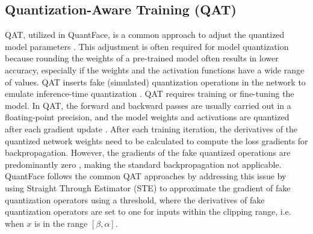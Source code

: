 \documentclass[a4paper,conference]{IEEEtran}
\begin{document}
\vspace{-1mm}
\subsection{Quantization-Aware Training (QAT)}
\vspace{-1mm}
QAT, utilized in QuantFace, is a common approach to adjust the quantized model parameters \cite{DBLP:conf/cvpr/WuLWHC16,DBLP:conf/cvpr/JacobKCZTHAK18}. This adjustment is often required for model quantization because rounding the weights of a pre-trained model often results in lower accuracy, especially if the weights and the activation functions have a wide range of values.
QAT inserts fake (simulated) quantization operations in the network to emulate inference-time quantization \cite{DBLP:conf/cvpr/JacobKCZTHAK18}. QAT requires training or fine-tuning the model. In QAT,  the forward and backward passes are usually carried out in a floating-point precision, and the model weights and activations are quantized after each gradient update \cite{DBLP:conf/cvpr/JacobKCZTHAK18}. 
After each training iteration, the derivatives of the quantized network weights need to be calculated to compute the loss gradients for backpropagation.
However, the gradients of the fake quantized operations are predominantly zero \cite{krishnamoorthi2018quantizing}, making the standard backpropagation not applicable. QuantFace follows the common QAT approaches \cite{krishnamoorthi2018quantizing,DBLP:conf/cvpr/JacobKCZTHAK18} by addressing this issue \textcolor{black}{by} using Straight Through Estimator (STE) \cite{DBLP:journals/corr/BengioLC13} to approximate the gradient of fake quantization operators using a threshold, where the derivatives of fake quantization operators are set to one for inputs within the clipping range, i.e. when $x$ is in the range $[\beta, \alpha]$.


\vspace{-1mm}
\end{document}
